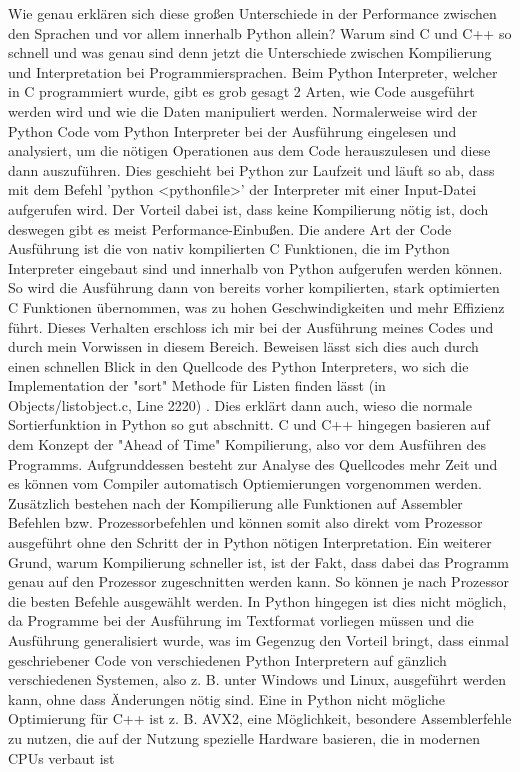 \documentclass[11pt,a4paper]{article}
\begin{document}
Wie genau erklären sich diese großen Unterschiede in der Performance zwischen den Sprachen und vor allem innerhalb Python allein?
Warum sind C und C++ so schnell und was genau sind denn jetzt die Unterschiede zwischen Kompilierung und Interpretation bei Programmiersprachen.
Beim Python Interpreter, welcher in C programmiert wurde, gibt es grob gesagt 2 Arten, wie Code ausgeführt werden wird und
wie die Daten manipuliert werden. Normalerweise wird der Python Code vom Python Interpreter bei der Ausführung eingelesen und analysiert,
um die nötigen Operationen aus dem Code herauszulesen und diese dann auszuführen. Dies geschieht bei Python zur Laufzeit und läuft so ab,
dass mit dem Befehl 'python <pythonfile>' der Interpreter mit einer Input-Datei aufgerufen wird. Der Vorteil dabei ist, dass keine Kompilierung nötig ist,
doch deswegen gibt es meist Performance-Einbußen. Die andere Art der Code Ausführung ist die von nativ kompilierten C Funktionen,
die im Python Interpreter eingebaut sind und innerhalb von Python aufgerufen werden können. So wird die Ausführung dann von
bereits vorher kompilierten, stark optimierten C Funktionen übernommen, was zu hohen Geschwindigkeiten und mehr Effizienz führt.
Dieses Verhalten erschloss ich mir bei der Ausführung meines Codes und durch mein Vorwissen in diesem Bereich. Beweisen lässt sich
dies auch durch einen schnellen Blick in den Quellcode des Python Interpreters, wo sich die Implementation der "sort" Methode für Listen
finden lässt (in Objects/listobject.c, Line 2220) \cite{pythonsource}. Dies erklärt dann auch, wieso die normale Sortierfunktion in Python so gut abschnitt.
C und C++ hingegen basieren auf dem Konzept der "Ahead of Time" Kompilierung, also vor dem Ausführen des Programms.
Aufgrunddessen besteht zur Analyse des Quellcodes mehr Zeit und es können vom Compiler automatisch Optiemierungen vorgenommen werden.
Zusätzlich bestehen nach der Kompilierung alle Funktionen auf Assembler Befehlen bzw. Prozessorbefehlen und können somit 
also direkt vom Prozessor ausgeführt ohne den Schritt der in Python nötigen Interpretation.
Ein weiterer Grund, warum Kompilierung schneller ist, ist der Fakt, dass dabei das Programm genau auf den Prozessor zugeschnitten
werden kann. So können je nach Prozessor die besten Befehle ausgewählt werden. In Python hingegen ist dies nicht möglich,
da Programme bei der Ausführung im Textformat vorliegen müssen und die Ausführung generalisiert wurde, was im Gegenzug den Vorteil bringt,
dass einmal geschriebener Code von verschiedenen Python Interpretern auf gänzlich verschiedenen Systemen, also z. B. unter Windows und Linux,
ausgeführt werden kann, ohne dass Änderungen nötig sind.
Eine in Python nicht mögliche Optimierung für C++ ist z. B. AVX2, eine Möglichkeit, besondere Assemblerfehle
zu nutzen, die auf der Nutzung spezielle Hardware basieren, die in modernen CPUs verbaut ist 
\end{document}

